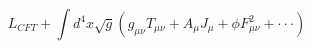 \begin{equation}
L_{CFT}+\int d^4x\sqrt{g}(g_{\mu\nu}T_{\mu\nu}+A_{\mu}J_{\mu}+
\phi F_{\mu\nu}^2+\cdot\cdot\cdot )
\label{e21} 
\end{equation}

